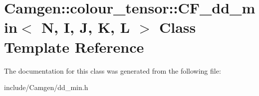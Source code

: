 \hypertarget{a00030}{}\section{Camgen\+:\+:colour\+\_\+tensor\+:\+:C\+F\+\_\+dd\+\_\+min$<$ N, I, J, K, L $>$ Class Template Reference}
\label{a00030}


The documentation for this class was generated from the following file\+:\begin{DoxyCompactItemize}
\item 
include/\+Camgen/dd\+\_\+min.\+h\end{DoxyCompactItemize}
